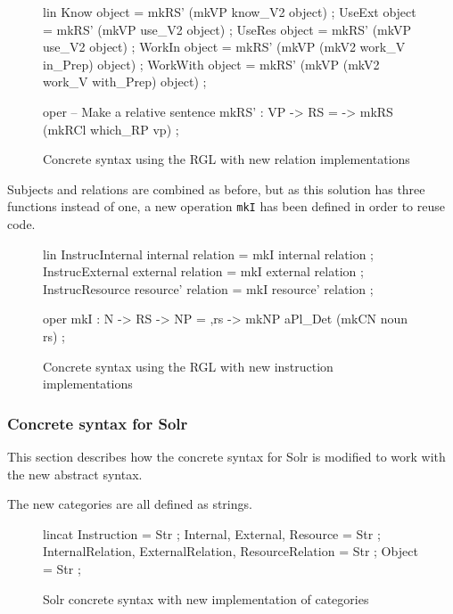 \begin{figure}[H]
\begin{code}
lin
  Know object = mkRS' (mkVP know_V2 object) ;
  UseExt object = mkRS' (mkVP use_V2 object) ;
  UseRes object = mkRS' (mkVP use_V2 object) ;
  WorkIn object = mkRS' (mkVP (mkV2 work_V in_Prep) object) ;
  WorkWith object = mkRS' (mkVP (mkV2 work_V with_Prep) object) ;

oper
  -- Make a relative sentence
  mkRS' : VP -> RS = \vp -> mkRS (mkRCl which_RP vp) ;
\end{code}
\caption{Concrete syntax using the RGL with new relation implementations\label{fig:rgl-new-relations}}
\end{figure}

Subjects and relations are combined as before, but as this solution has three functions instead of one, a new operation \texttt{mkI} has been defined in order to reuse code.

\begin{figure}[H]
\begin{code}
lin
  InstrucInternal internal relation = mkI internal relation ;
  InstrucExternal external relation = mkI external relation ;
  InstrucResource resource' relation = mkI resource' relation ;

oper
  mkI : N -> RS -> NP = \noun,rs -> mkNP aPl_Det 
                             (mkCN noun rs) ;
\end{code}
\caption{Concrete syntax using the RGL with new instruction implementations\label{fig:rgl-new-instructions}}
\end{figure}

\subsubsection*{Concrete syntax for Solr}
This section describes how the concrete syntax for Solr is modified to work with the new abstract syntax.

The new categories are all defined as strings.

\begin{figure}[H]
\begin{code}
lincat
  Instruction = Str ;
  Internal, External, Resource = Str ;
  InternalRelation, ExternalRelation, ResourceRelation = Str ;
  Object = Str ;
\end{code}
\caption{Solr concrete syntax with new implementation of categories\label{fig:solr-categories-impl}}
\end{figure}

